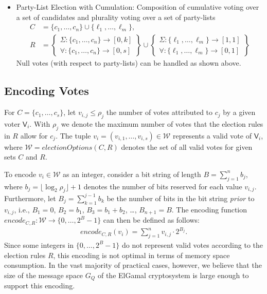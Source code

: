 \documentclass[bibtotoc,halfparskip,oneside]{scrreprt}
\newcommand{\Voter}[1]{\ensuremath{\mathsf{V}_{#1}}\xspace}
\begin{document}
\begin{itemize}
		\item Party-List Election with Cumulation: Composition of cumulative voting over a set of candidates and plurality voting over a set of party-lists
		\begin{align*}
			C&=\{c_1,\ldots,c_n\}\cup\{\ell_1,\ldots,\ell_m\},\\
			R&=\left\{\begin{aligned}\Sigma:\{c_1,\ldots,c_n\}\rightarrow[0,k] \\ \forall:\{c_1,\ldots,c_n\}\rightarrow[0,s]\end{aligned}\right\} \cup
			\left\{\begin{aligned}\Sigma:\{\ell_1,\ldots,\ell_m\}\rightarrow[1,1] \\ \forall:\{\ell_1,\ldots,\ell_m\}\rightarrow[0,1]\end{aligned}\right\}
		\end{align*}
		Null votes (with respect to party-lists) can be handled as shown above.
	\end{itemize}
	
	
	\subsection{Encoding Votes}\label{votes}
	
	For $C=\{c_1,\ldots,c_s\}$, let $v_{i,j}\leq \rho_j$ the number of votes attributed to $c_j$ by a given voter $\Voter{i}$. With $\rho_j$ we denote the maximum number of votes that the election rules in $R$ allow for $c_j$. The tuple $v_i=(v_{i,1},\ldots,v_{i,s})\in\mathcal{W}$ represents a valid vote of \Voter{i}, where $\mathcal{W}=\mathit{electionOptions}(C,R)$ denotes the set of all valid votes for given sets $C$ and $R$.
	
	To encode $v_i\in \mathcal{W}$ as an integer, consider a bit string of length $B=\sum_{j=1}^n b_j$, where $b_j=\lfloor\log_2\rho_j\rfloor+1$ denotes the number of bits reserved for each value $v_{i,j}$. Furthermore, let $B_j=\sum_{k=1}^{j-1}b_k$ be the number of bits in the bit string \emph{prior} to $v_{i,j}$, i.e., $B_1=0$, $B_2=b_1$, $B_3=b_1+b_2$, \ldots, $B_{n+1}=B$. The encoding function $\mathit{encode}_{C,R}:\mathcal{W}\rightarrow \{0,\ldots,2^B{-}1\}$ can then be defined as follows:
	\begin{align*}
		\mathit{encode}_{C,R}(v_i) = \sum_{j=1}^n v_{i,j}\cdot 2^{B_j}.
	\end{align*}
	Since some integers in $\{0,\ldots,2^B{-}1\}$ do not represent valid votes according to the election rules $R$, this encoding is not optimal in terms of memory space consumption. In the vast majority of practical cases, however, we believe that the size of the message space $G_Q$ of the ElGamal cryptosystem is large enough to support this encoding.
	
\end{document}
